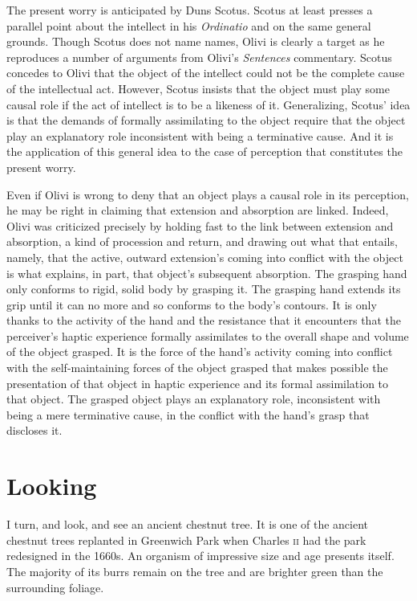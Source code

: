 \documentclass[12pt]{article}
\begin{document}
The present worry is anticipated by Duns Scotus. Scotus at least presses a parallel point about the intellect in his \emph{Ordinatio} and on the same general grounds. Though Scotus does not name names, Olivi is clearly a target as he reproduces a number of arguments from Olivi's \emph{Sentences} commentary. Scotus concedes to Olivi that the object of the intellect could not be the complete cause of the intellectual act. However, Scotus insists that the object must play some causal role if the act of intellect is to be a likeness of it. Generalizing, Scotus' idea is that the demands of formally assimilating to the object require that the object play an explanatory role inconsistent with being a terminative cause. And it is the application of this general idea to the case of perception that constitutes the present worry.

Even if Olivi is wrong to deny that an object plays a causal role in its perception, he may be right in claiming that extension and absorption are linked. Indeed, Olivi was criticized precisely by holding fast to the link between extension and absorption, a kind of procession and return, and drawing out what that entails, namely, that the active, outward extension's coming into conflict with the object is what explains, in part, that object's subsequent absorption. The grasping hand only conforms to rigid, solid body by grasping it. The grasping hand extends its grip until it can no more and so conforms to the body's contours. It is only thanks to the activity of the hand and the resistance that it encounters that the perceiver's haptic experience formally assimilates to the overall shape and volume of the object grasped. It is the force of the hand's activity coming into conflict with the self-maintaining forces of the object grasped that makes possible the presentation of that object in haptic experience and its formal assimilation to that object. The grasped object plays an explanatory role, inconsistent with being a mere terminative cause, in the conflict with the hand's grasp that discloses it. 


\section{Looking} %
\label{sec:looking}

I turn, and look, and see an ancient chestnut tree. It is one of the ancient chestnut trees replanted in Greenwich Park when Charles \textsc{ii} had the park redesigned in the 1660s. An organism of impressive size and age presents itself. The majority of its burrs remain on the tree and are brighter green than the surrounding foliage. 
\end{document}

